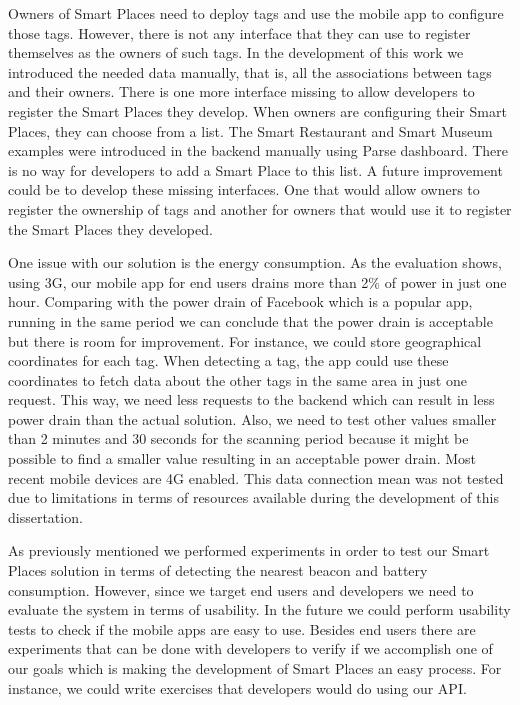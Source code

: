 Owners of Smart Places need to deploy tags and use the mobile app to configure those tags.
However, there is not any interface that they can use to register themselves as the owners of such tags.
In the development of this work we introduced the needed data manually, that is,
all the associations between tags and their owners.
There is one more interface missing to allow developers to register the Smart Places they develop.
When owners are configuring their Smart Places, they can choose from a list.
The Smart Restaurant and Smart Museum examples were introduced in the backend manually using Parse dashboard.
There is no way for developers to add a Smart Place to this list.
A future improvement could be to develop these missing interfaces.
One that would allow owners to register the ownership of tags and another for owners that would use it to register the Smart Places they developed.

One issue with our solution is the energy consumption.
As the evaluation shows, using \gls{3G}, our mobile app for end users drains more than 2\% of power in just one hour.
Comparing with the power drain of Facebook which is a popular app, running in the same period we can conclude that the power drain is acceptable but there is room for improvement.
For instance, we could store geographical coordinates for each tag.
When detecting a tag, the app could use these coordinates to fetch data about the other tags in the same area in just one request.
This way, we need less requests to the backend which can result in less power drain than the actual solution.
Also, we need to test other values smaller than 2 minutes and 30 seconds for the scanning period because it might be possible to find a smaller value resulting in an acceptable power drain.
Most recent mobile devices are \gls{4G} enabled.
This data connection mean was not tested due to limitations in terms of resources available during the development of this dissertation.

As previously mentioned we performed experiments in order to test our Smart Places solution in terms of detecting the nearest beacon and battery consumption.
However, since we target end users and developers we need to evaluate the system in terms of usability.
In the future we could perform usability tests to check if the mobile apps are easy to use.
Besides end users there are experiments that can be done with developers to verify if we accomplish one of our goals which is making the development of Smart Places an easy process.
For instance, we could write exercises that developers would do using our \gls{API}.

